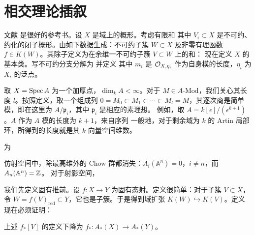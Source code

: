 \section{相交理论插叙}
文献 \cite{ref11} 是很好的参考书。设 $X$ 是域上的概形。考虑有限和
其中 $V_i\subset X$ 是不可约、约化的闭子概形。由如下数据生成：不可约子簇 $W\subset X$ 及非零有理函数 $f\in K(W)$。其除子定义为在余维一不可约子簇 $V\subset W$ 上的和：
现在定义 $X$ 的基本类。写不可约分支分解为
并定义
其中 $m_i$ 是 $\mathcal O_{X,\eta_i}$ 作为自身模的长度，$\eta_i$ 为 $X_i$ 的泛点。
\begin{example}\label{ex:3.1}
取 $X=\operatorname{Spec} A$ 为一个加厚点，$\dim_kA<\infty$。对于 $M\in A\text{-}\mathrm{Mod}$，我们关心其长度 $l$。按照定义，取一个组成列 $0=M_0\subset M_1\subset\cdots\subset M_l=M$，其逐次商是简单模，即在这里为 $A/\mathfrak p_i$，其中 $\mathfrak p_i$ 是相应的素理想。
例如，取 $A=k[\epsilon]/(\epsilon^{k+1})$。$A$ 作为 $A$ 模的长度为 $k+1$，来自序列
一般地，对于剩余域为 $k$ 的 Artin 局部环，所得到的长度就是其 $k$ 向量空间维数。
\end{example}
为
\begin{example}\label{ex:3.2}
仿射空间中，除最高维外的 Chow 群都消失：$A_i(\mathbb A^n)=0$，$i\ne n$，而 $A_n(\mathbb A^n)=\mathbb Z$。
对于射影空间，
\end{example}
我们先定义固有推前。设 $f:X\to Y$ 为固有态射。定义很简单：对于子簇 $V\subset X$，令 $W=f(V)_{\mathrm{red}}\subset Y$，它也是子簇。于是得到域扩张 $K(W)\hookrightarrow K(V)$。定义
现在必须证明：
\begin{proposition}\label{pro:3.4}
上述 $f_*[V]$ 的定义下降为 $f_*:A_*(X)\to A_*(Y)$。
\end{proposition}
